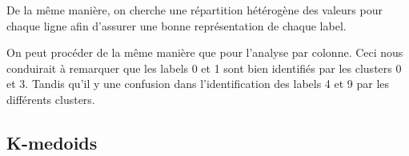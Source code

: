 \documentclass[french,a4paper,18pt]{article}
\begin{document}
De la même manière, on cherche une répartition hétérogène des valeurs pour chaque ligne
afin d'assurer une bonne représentation de chaque label.

On peut procéder de la même manière que pour l'analyse par colonne. 
Ceci nous conduirait à remarquer que les labels 0 et 1 sont bien identifiés
par les clusters 0 et 3.
Tandis qu'il y une confusion dans l'identification des labels 4 et 9 par les différents clusters.

\subsection{K-medoids}
\end{document}
